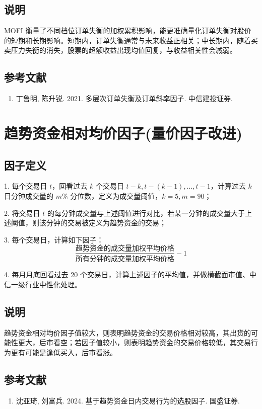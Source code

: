 \documentclass{article}
\begin{document}
\subsection{说明}
MOFI 衡量了不同档位订单失衡的加权累积影响，能更准确量化订单失衡对股价的短期和长期影响。短期内，订单失衡通常与未来收益正相关；中长期内，随着买卖压力失衡的消失，股票的超额收益出现均值回复，与收益相关性会减弱。

\subsection{参考文献}
\begin{enumerate}
    \item 丁鲁明, 陈升锐. 2021. 多层次订单失衡及订单斜率因子. 中信建投证券.
\end{enumerate}

\section{趋势资金相对均价因子(量价因子改进)}

\subsection{因子定义}

1. 每个交易日 \( t \)，回看过去 \( k \) 个交易日 \( t-k, t-(k-1), \ldots, t-1 \)，计算过去 \( k \) 日分钟成交量的 \( m\% \) 分位数，定义为成交量阈值，\( k=5, m=90 \)；

2. 将交易日 \( t \) 的每分钟成交量与上述阈值进行对比，若某一分钟的成交量大于上述阈值，则该分钟的交易被定义为趋势资金的交易；

3. 每个交易日，计算如下因子：
\begin{equation}
    \frac{\text{趋势资金的成交量加权平均价格}}{\text{所有分钟的成交量加权平均价格}} - 1
\end{equation}

4. 每月月底回看过去 20 个交易日，计算上述因子的平均值，并做横截面市值、中信一级行业中性化处理。

\subsection{说明}
趋势资金相对均价因子值较大，则表明趋势资金的交易价格相对较高，其出货的可能性更大，后市看空；若因子值较小，则表明趋势资金的交易价格较低，其交易行为更有可能是逢低买入，后市看涨。

\subsection{参考文献}
\begin{enumerate}
    \item 沈亚琦, 刘富兵. 2024. 基于趋势资金日内交易行为的选股因子. 国盛证券.
\end{enumerate}
\end{document}
